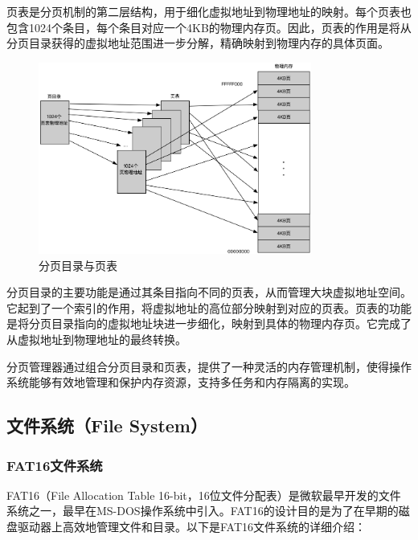 页表是分页机制的第二层结构，用于细化虚拟地址到物理地址的映射。每个页表也包含1024个条目，每个条目对应一个4KB的物理内存页。因此，页表的作用是将从分页目录获得的虚拟地址范围进一步分解，精确映射到物理内存的具体页面。

\begin{figure}[htbp]
    \centering
    \includegraphics[width=0.8\textwidth]{figures/PageDirectoryAndPageTable.png}
    \caption{分页目录与页表}
    \label{fig:PageDirectoryAndPageTable}
\end{figure}

分页目录的主要功能是通过其条目指向不同的页表，从而管理大块虚拟地址空间。它起到了一个索引的作用，将虚拟地址的高位部分映射到对应的页表。页表的功能是将分页目录指向的虚拟地址块进一步细化，映射到具体的物理内存页。它完成了从虚拟地址到物理地址的最终转换。

分页管理器通过组合分页目录和页表，提供了一种灵活的内存管理机制，使得操作系统能够有效地管理和保护内存资源，支持多任务和内存隔离的实现。

\subsection{文件系统（File System）}

\subsubsection{FAT16文件系统}

FAT16（File Allocation Table 16-bit，16位文件分配表）是微软最早开发的文件系统之一，最早在MS-DOS操作系统中引入。FAT16的设计目的是为了在早期的磁盘驱动器上高效地管理文件和目录。以下是FAT16文件系统的详细介绍：

